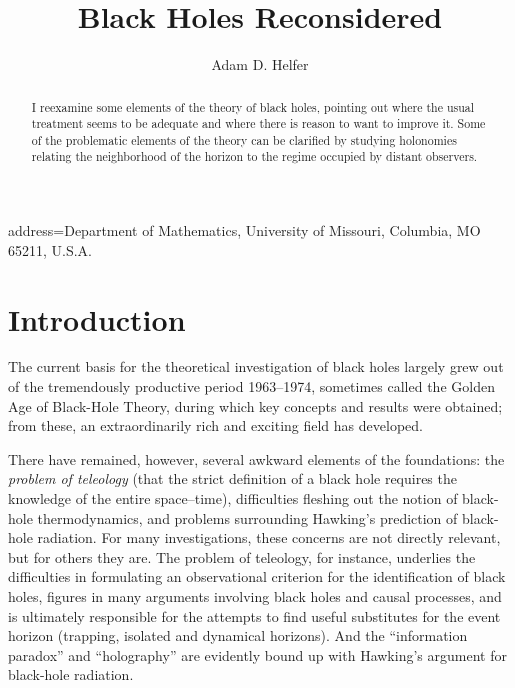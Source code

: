 \documentclass[
%
draft    %
,numberedheadings 
,bibliocites
  ]
  {aipproc}
\begin{document}
\title{Black Holes Reconsidered}




\author{Adam D. Helfer}{
  address={Department of Mathematics, University of Missouri, Columbia, MO 65211, U.S.A.}
}


\begin{abstract}
I reexamine some elements of the theory of black holes, pointing out where the usual treatment seems to be adequate and where there is reason to want to improve it.  Some of the problematic elements of the theory can be clarified by studying holonomies relating the neighborhood of the horizon to the regime occupied by distant observers.
\end{abstract}

\maketitle


\section*{Introduction}

The current basis for the theoretical investigation of black holes largely grew out of the tremendously productive period 1963--1974, sometimes called the Golden Age of Black-Hole Theory, during which key concepts and results were obtained; from these, an extraordinarily rich and exciting
field has developed.

There have remained, however, several awkward elements of the foundations:  the {\em problem of teleology} (that the strict definition of a  black hole requires the knowledge of the entire
 space--time), difficulties fleshing out the notion of black-hole thermodynamics, and problems surrounding Hawking's prediction of black-hole radiation.  For many investigations, these concerns are not directly relevant, but for others they are.  
The problem of teleology, for instance, underlies the difficulties in formulating an observational criterion for the identification of black holes, figures in many arguments involving black holes and causal processes, and is ultimately responsible for the
attempts to find useful substitutes for the event horizon (trapping, isolated and dynamical horizons).
And the ``information paradox'' and ``holography'' are evidently bound up with Hawking's argument for black-hole radiation. 
\end{document}
